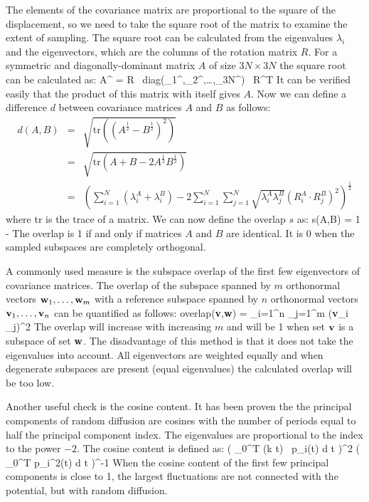 The elements of the covariance matrix are proportional to the square
of the displacement, so we need to take the square root of the matrix
to examine the extent of sampling. The square root can be
calculated from the eigenvalues $\lambda_i$ and the eigenvectors,
which are the columns of the rotation matrix $R$.
For a symmetric and diagonally-dominant matrix $A$ of size $3N \times 3N$
the square root can be calculated as:
\beq
A^ = 
R \, \mbox{diag}(\lambda_1^,\lambda_2^,\ldots,\lambda_{3N}^) \, R^T
\eeq
It can be verified easily that the product of this matrix with itself gives
$A$.
Now we can define a difference $d$ between covariance matrices $A$ and $B$
as follows:
\begin{eqnarray}
d(A,B) & = & \sqrt{\mbox{tr}\left(\left(A^\frac{1}{2} - B^\frac{1}{2}\right)^2\right)
}
\\ & = &
\sqrt{\mbox{tr}\left(A + B - 2 A^\frac{1}{2} B^\frac{1}{2}\right)}
\\ & = &
\left( \sum_{i=1}^N \left( \lambda_i^A + \lambda_i^B \right)
- 2 \sum_{i=1}^N \sum_{j=1}^N \sqrt{\lambda_i^A \lambda_j^B}
\left(R_i^A \cdot R_j^B\right)^2 \right)^\frac{1}{2}
\end{eqnarray}
where tr is the trace of a matrix.
We can now define the overlap $s$ as:
\beq
s(A,B) = 1 - 
\eeq
The overlap is 1 if and only if matrices $A$ and $B$ are identical.
It is 0 when the sampled subspaces are completely orthogonal.

A commonly used measure is the subspace overlap of the first few
eigenvectors of covariance matrices.
The overlap of the subspace spanned by $m$ orthonormal vectors 
${\bf w}_1,\ldots,{\bf w}_m$ with a reference subspace spanned by 
$n$ orthonormal vectors ${\bf v}_1,\ldots,{\bf v}_n$
can be quantified as follows:
\beq
\mbox{overlap}({\bf v},{\bf w}) =
 \sum_{i=1}^n \sum_{j=1}^m ({\bf v}_i _j)^2
\eeq
The overlap will increase with increasing $m$ and will be 1 when
set ${\bf v}$ is a subspace of set ${\bf w}$.
The disadvantage of this method is that it does not take the eigenvalues
into account. All eigenvectors are weighted equally and when
degenerate subspaces are present (equal eigenvalues) the calculated overlap
will be too low.

Another useful check is the cosine content. It has been proven the
the principal components of random diffusion are cosines with the
number of periods equal to half the principal component index\cite{Hess2000}.
The eigenvalues are proportional to the index to the power $-2$.
The cosine content is defined as:
\beq
{}
\left( \int_0^T \cos(k \pi t) \, p_i(t) \mbox{d} t \right)^2
\left( \int_0^T p_i^2(t) \mbox{d} t \right)^{-1}
\eeq
When the cosine content of the first few principal components
is close to 1, the largest fluctuations are not connected with
the potential, but with random diffusion.

